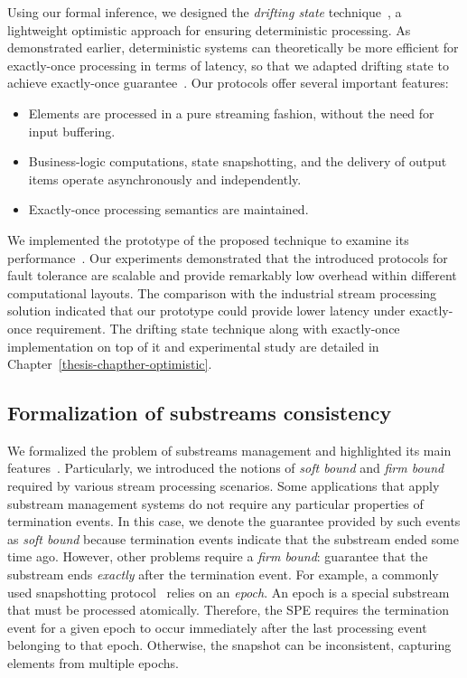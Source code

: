 Using our formal inference, we designed the \textit{drifting state} technique~\cite{we2018adbis}, a lightweight optimistic approach for ensuring deterministic processing. As demonstrated earlier, deterministic systems can theoretically be more efficient for exactly-once processing in terms of latency, so that we adapted drifting state to achieve exactly-once guarantee~\cite{thepaper}. Our protocols offer several important features:

\begin{itemize}
    \item Elements are processed in a pure streaming fashion, without the need for input buffering.
    \item Business-logic computations, state snapshotting, and the delivery of output items operate asynchronously and independently.
    \item Exactly-once processing semantics are maintained.
\end{itemize}

We implemented the prototype of the proposed technique to examine its performance~\cite{we2018adbis, we2018seim, thepaper}. Our experiments demonstrated that the introduced protocols for fault tolerance are scalable and provide remarkably low overhead within different computational layouts. The comparison with the industrial stream processing solution indicated that our prototype could provide lower latency under exactly-once requirement. The drifting state technique along with exactly-once implementation on top of it and experimental study are detailed in Chapter~\ref{thesis-chapther-optimistic}.

\subsection{Formalization of substreams consistency}

We formalized the problem of substreams management and highlighted its main features~\cite{10.1145/3524860.3539809, trofimov2023bounding}. Particularly, we introduced the notions of {\em soft bound} and {\em firm bound} required by various stream processing scenarios. Some applications that apply substream management systems do not require any particular properties of termination events. In this case, we denote the guarantee provided by such events as {\em soft bound} because termination events indicate that the substream ended some time ago. However, other problems require a {\em firm bound}: guarantee that the substream ends {\em exactly} after the termination event. For example, a commonly used snapshotting protocol~\cite{2015arXiv150608603C, jacques2016consistent} relies on an {\em epoch}. An epoch is a special substream that must be processed atomically. Therefore, the SPE requires the termination event for a given epoch to occur immediately after the last processing event belonging to that epoch. Otherwise, the snapshot can be inconsistent, capturing elements from multiple epochs.

